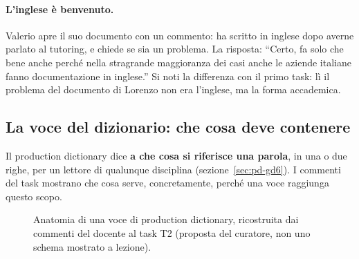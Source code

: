 \paragraph{L'inglese è benvenuto.} Valerio apre il suo documento con un
commento: ha scritto in inglese dopo averne parlato al tutoring, e chiede se
sia un problema. La risposta: ``Certo, fa solo che bene anche perché nella
stragrande maggioranza dei casi anche le aziende italiane fanno
documentazione in inglese.'' Si noti la differenza con il primo task: lì il
problema del documento di Lorenzo non era l'inglese, ma la forma accademica.

\subsection{La voce del dizionario: che cosa deve contenere}
\label{rv:t2:sec:voce}

Il production dictionary dice \textbf{a che cosa si riferisce una parola}, in
una o due righe, per un lettore di qualunque disciplina
(sezione~\ref{sec:pd-gd6}). I commenti del task mostrano che cosa serve,
concretamente, perché una voce raggiunga questo scopo.

\begin{figure}[htbp]
  \centering
  \caption{Anatomia di una voce di production dictionary, ricostruita dai
  commenti del docente al task T2 (proposta del curatore, non uno schema
  mostrato a lezione).}
  \label{rv:t2:fig:voce}
\end{figure}

